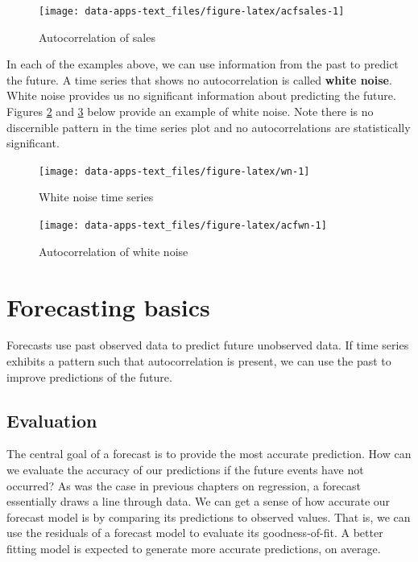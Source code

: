\documentclass[
]{book}
\begin{document}
\begin{figure}

{\centering \texttt{[image: data-apps-text\_files/figure-latex/acfsales-1]} 

}

\caption{Autocorrelation of sales}\label{fig:acfsales}
\end{figure}

In each of the examples above, we can use information from the past to predict the future. A time series that shows no autocorrelation is called \textbf{white noise}. White noise provides us no significant information about predicting the future. Figures \ref{fig:wn} and \ref{fig:acfwn} below provide an example of white noise. Note there is no discernible pattern in the time series plot and no autocorrelations are statistically significant.

\begin{figure}

{\centering \texttt{[image: data-apps-text\_files/figure-latex/wn-1]} 

}

\caption{White noise time series}\label{fig:wn}
\end{figure}

\begin{figure}

{\centering \texttt{[image: data-apps-text\_files/figure-latex/acfwn-1]} 

}

\caption{Autocorrelation of white noise}\label{fig:acfwn}
\end{figure}

\hypertarget{forecasting-basics}{%
\section{Forecasting basics}\label{forecasting-basics}}

Forecasts use past observed data to predict future unobserved data. If time series exhibits a pattern such that autocorrelation is present, we can use the past to improve predictions of the future.

\hypertarget{evaluation}{%
\subsection{Evaluation}\label{evaluation}}

The central goal of a forecast is to provide the most accurate prediction. How can we evaluate the accuracy of our predictions if the future events have not occurred? As was the case in previous chapters on regression, a forecast essentially draws a line through data. We can get a sense of how accurate our forecast model is by comparing its predictions to observed values. That is, we can use the residuals of a forecast model to evaluate its goodness-of-fit. A better fitting model is expected to generate more accurate predictions, on average.
\end{document}
